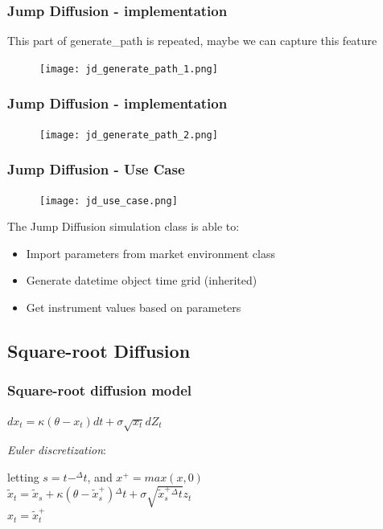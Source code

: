 \documentclass{beamer}
\begin{document}
\begin{frame}
\frametitle{Jump Diffusion - implementation}
This part of generate\_path is repeated, maybe we can capture this feature
\begin{figure}[H]
	\texttt{[image: jd\_generate\_path\_1.png]}
\end{figure}
\end{frame}

\begin{frame}
\frametitle{Jump Diffusion - implementation}
\begin{figure}[H]
	\texttt{[image: jd\_generate\_path\_2.png]}
\end{figure}
\end{frame}

\begin{frame}
\frametitle{Jump Diffusion - Use Case}
\begin{figure}[H]
	\texttt{[image: jd\_use\_case.png]}
\end{figure}
The Jump Diffusion simulation class is able to:
\begin{itemize}
	\item Import parameters from market environment class
	\item Generate datetime object time grid (inherited)
	\item Get instrument values based on parameters
\end{itemize}
\end{frame}

\subsection{Square-root Diffusion}
\begin{frame}
\frametitle{Square-root diffusion model}
\begin{center}
	$dx_{t} = \kappa(\theta-x_{t})dt + \sigma\sqrt{x_{t}}dZ_{t}$
\end{center}
\emph{Euler discretization}:
\begin{center}
	letting $s = t-^{\Delta}t$, and $x^{+} = max(x,0)$\\[3mm]
	$\tilde{x}_{t} = \tilde{x}_{s} + \kappa(\theta-\tilde{x}_{s}^{+}){^{\Delta}t} + \sigma\sqrt{\tilde{x}_{s}^{+}{^{\Delta}t}}z_{t}$\\[3mm]
	$x_{t} = \tilde{x}_{t}^{+}$
\end{center}
\end{frame}
\end{document}
